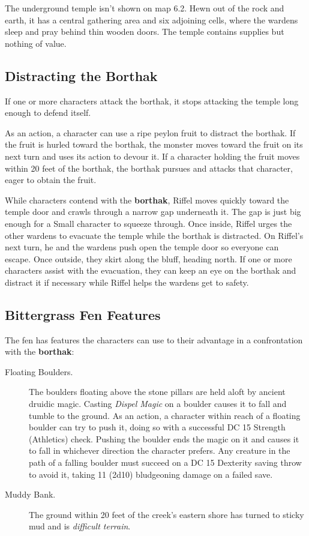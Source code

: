 \documentclass[10pt,a4paper,twoside,bg=print,twocolumn,openany,nodeprecatedcode]{dndbook}
\begin{document}
The underground temple isn't shown on map 6.2. Hewn out of the rock and earth, it has a central gathering area and six adjoining cells, where the wardens sleep and pray behind thin wooden doors. The temple contains supplies but nothing of value.

\subsection{Distracting the Borthak}
If one or more characters attack the borthak, it stops attacking the temple long enough to defend itself.

As an action, a character can use a ripe peylon fruit to distract the borthak. If the fruit is hurled toward the borthak, the monster moves toward the fruit on its next turn and uses its action to devour it. If a character holding the fruit moves within 20 feet of the borthak, the borthak pursues and attacks that character, eager to obtain the fruit.

While characters contend with the \textbf{borthak}, Riffel moves quickly toward the temple door and crawls through a narrow gap underneath it. The gap is just big enough for a Small character to squeeze through. Once inside, Riffel urges the other wardens to evacuate the temple while the borthak is distracted. On Riffel's next turn, he and the wardens push open the temple door so everyone can escape. Once outside, they skirt along the bluff, heading north. If one or more characters assist with the evacuation, they can keep an eye on the borthak and distract it if necessary while Riffel helps the wardens get to safety.

\subsection{Bittergrass Fen Features}
The fen has features the characters can use to their advantage in a confrontation with the \textbf{borthak}:


\begin{description}
\item[Floating Boulders.]
The boulders floating above the stone pillars are held aloft by ancient druidic magic. Casting \textit{Dispel Magic} on a boulder causes it to fall and tumble to the ground. As an action, a character within reach of a floating boulder can try to push it, doing so with a successful DC 15 Strength (Athletics) check. Pushing the boulder ends the magic on it and causes it to fall in whichever direction the character prefers. Any creature in the path of a falling boulder must succeed on a DC 15 Dexterity saving throw to avoid it, taking 11 (2d10) bludgeoning damage on a failed save.
\item[Muddy Bank.]
The ground within 20 feet of the creek's eastern shore has turned to sticky mud and is \textit{difficult terrain}.
\end{description}
\end{document}
